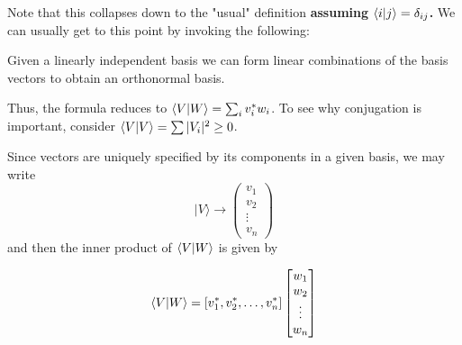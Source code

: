 \documentclass[11pt]{scrartcl}
\begin{document}
Note that this collapses down to the "usual" definition \textbf{assuming $ \braket{i|j} = \delta_{ij} $.} We can usually get to this point by invoking the following:

\begin{theorem}
	Given a linearly independent basis we can form linear combinations of the basis vectors to obtain an orthonormal basis. 
\end{theorem}

Thus, the formula reduces to $ \braket{V|W}  = \sum_i v_i^* w_i $. To see why conjugation is important, consider $ \braket{V|V}  = \sum | V_i | ^2 \geq 0 $. 

Since vectors are uniquely specified by its components in a given basis, we may write 
\begin{equation}
	|V \rangle \rightarrow \begin{pmatrix}
	v_1 \\ v_2 \\ \vdots \\ v_n
	\end{pmatrix} 
\end{equation}
and then the inner product of $ \braket{V|W}  $ is given by 

\begin{equation}
	\braket{V|W} = \left[ v_1^*, v_2^*, \ldots, v_n^* \right] \begin{bmatrix} w_1 \\ w_2 \\ \vdots \\ w_n \end{bmatrix}
\end{equation}
\end{document}
